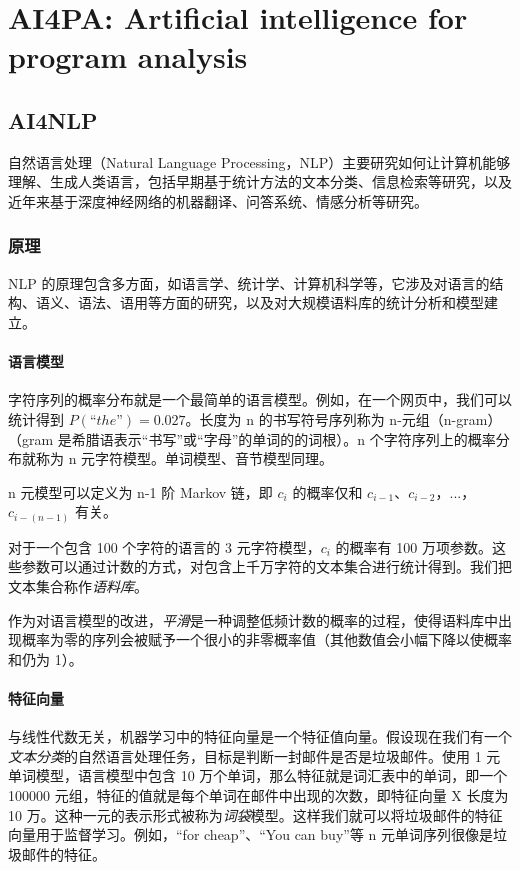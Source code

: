 \section{AI4PA: Artificial intelligence for program analysis}

\subsection{AI4NLP}

自然语言处理（Natural Language Processing，NLP）主要研究如何让计算机能够理解、生成人类语言，包括早期基于统计方法的文本分类、信息检索等研究，以及近年来基于深度神经网络的机器翻译、问答系统、情感分析等研究。

\subsubsection{原理}

NLP 的原理包含多方面，如语言学、统计学、计算机科学等，它涉及对语言的结构、语义、语法、语用等方面的研究，以及对大规模语料库的统计分析和模型建立。

\paragraph{语言模型}
字符序列的概率分布就是一个最简单的语言模型。例如，在一个网页中，我们可以统计得到 $P(“the”)=0.027$。长度为 n 的书写符号序列称为 n-元组（n-gram）（gram 是希腊语表示“书写”或“字母”的单词的的词根）。n 个字符序列上的概率分布就称为 n 元字符模型。单词模型、音节模型同理。

n 元模型可以定义为 n-1 阶 Markov 链，即 $c_i$ 的概率仅和 $c_{i-1}$、$c_{i-2}$，...，$c_{i-(n-1)}$ 有关。

对于一个包含 100 个字符的语言的 3 元字符模型，$c_i$ 的概率有 100 万项参数。这些参数可以通过计数的方式，对包含上千万字符的文本集合进行统计得到。我们把文本集合称作\textit{语料库}。

作为对语言模型的改进，\textit{平滑}是一种调整低频计数的概率的过程，使得语料库中出现概率为零的序列会被赋予一个很小的非零概率值（其他数值会小幅下降以使概率和仍为 1）。

\paragraph{特征向量}

与线性代数无关，机器学习中的特征向量是一个特征值向量。假设现在我们有一个\textit{文本分类}的自然语言处理任务，目标是判断一封邮件是否是垃圾邮件。使用 1 元单词模型，语言模型中包含 10 万个单词，那么特征就是词汇表中的单词，即一个 100000 元组，特征的值就是每个单词在邮件中出现的次数，即特征向量 X 长度为 10 万。这种一元的表示形式被称为\textit{词袋}模型。这样我们就可以将垃圾邮件的特征向量用于监督学习。例如，“for cheap”、“You can buy”等 n 元单词序列很像是垃圾邮件的特征。

